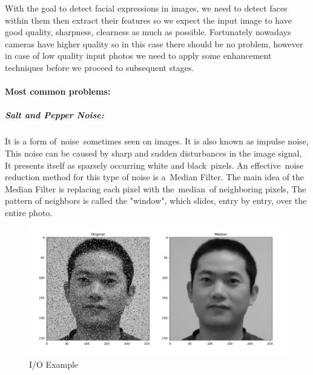 With the goal to detect facial expressions in images, we need to detect faces within them then extract their features so we expect the input image to have good quality, sharpness, clearness as much as possible.\newline
Fortunately nowadays cameras have higher quality so in this case there should be no problem, however in case of low quality input photos we need to apply some enhancement techniques before we proceed to subsequent stages.

\paragraph{Most common problems:}
\subparagraph{Salt and Pepper Noise:}
It is a form of noise sometimes seen on images. It is also known as impulse noise, This noise can be caused by sharp and sudden disturbances in the image signal, It presents itself as sparsely occurring white and black pixels.\newline
An effective noise reduction method for this type of noise is a Median Filter.\newline
The main idea of the Median Filter is  replacing each pixel with the median of neighboring pixels, The pattern of neighbors is called the "window", which slides, entry by entry, over the entire photo.

\begin{figure}[H]
	\centering
	\includegraphics[width=\linewidth]{images/salt_pepper.jpg}
	\caption{I/O Example}
\end{figure}

